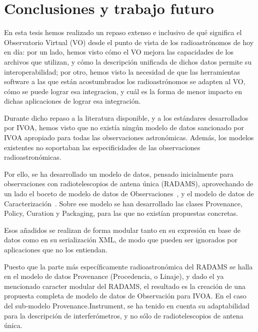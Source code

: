 \chapter*[Conclusiones y trabajo futuro]{Conclusiones y trabajo futuro}
\label{conclusiones}
	
	En esta tesis hemos realizado un repaso extenso e inclusivo
	de qué significa el Observatorio Virtual (VO) desde el punto de
	vista de los radioastrónomos de hoy en día: por un lado,
	hemos visto cómo el VO mejora las capacidades de los archivos
	que utilizan, y cómo la descripción unificada de dichos datos
	permite su interoperabilidad; por otro, hemos visto la
	necesidad de que las herramientas software a las que están
	acostumbrados los radioastrónomos se adapten al VO, cómo
	se puede lograr esa integracion, y cuál es la forma de menor
	impacto en dichas aplicaciones de lograr esa integración.
	
	Durante dicho repaso a la literatura disponible, y a los
	estándares desarrollados por IVOA, hemos visto que no
	existía ningún modelo de datos sancionado por IVOA
	apropiado para todas las observaciones astronómicas.
	Además, los modelos existentes no soportaban las
	especificidades de las observaciones radioastronómicas.
	
	Por ello, se ha desarrollado un modelo de datos, pensado
	inicialmente para observaciones con radiotelescopios de
	antena única (RADAMS), aprovechando de un lado el boceto de
	modelo de datos de Observaciones~\cite{2005dmo..rept.....M}, y
	el modelo de datos de Caracterización~\cite{2008dmadcrept.....L}.
	Sobre ese modelo se han desarrollado las clases Provenance,
	Policy, Curation y Packaging, para las que no existían
	propuestas concretas.
	
	Esos añadidos se realizan de forma modular tanto en su 
	expresión en base de datos como en su serialización XML, de
	modo que pueden ser ignorados por aplicaciones que no los
	entiendan.
	
	Puesto que la parte más específicamente radioastronómica del
	RADAMS se halla en el modelo de datos Provenance (Procedencia,
	o Linaje), y dado el ya mencionado caracter modular del RADAMS,
	el resultado es la creación de una propuesta completa de modelo
	de datos de Observación para IVOA. En el caso del sub-modelo
	Provenance.Instrument, se ha tenido en cuenta su adaptabilidad
	para la descripción de interferómetros, y no sólo de
	radiotelescopios de antena única.
	
